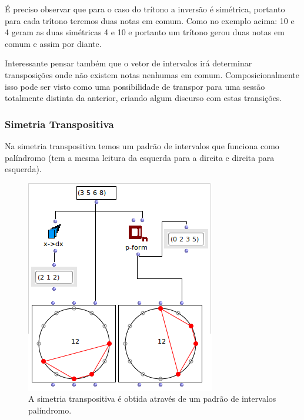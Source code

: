 \documentclass[
	12pt,				%
	openright,			%
	twoside,			%
	a4paper,			%
	english,			%
	french,				%
	spanish,			%
	brazil				%
	]{abntex2}
\begin{document}
É preciso observar que para o caso do trítono a inversão é simétrica, portanto para cada trítono teremos duas notas em comum. Como no exemplo acima: 10 e 4 geram as duas simétricas 4 e 10 e portanto um trítono gerou duas notas em comum e assim por diante.

Interessante pensar também que o vetor de intervalos irá determinar transposições onde não existem notas nenhumas em comum. Composicionalmente isso pode ser visto como uma possibilidade de transpor para uma sessão totalmente distinta da anterior, criando algum discurso com estas transições.


\subsubsection{Simetria Transpositiva}

Na simetria transpositiva temos um padrão de intervalos que funciona como palíndromo (tem a mesma leitura da esquerda para a direita e direita para esquerda).

\begin{figure}[!h]
	\caption{\label{fig_grafico}A simetria transpositiva é obtida através de um padrão de intervalos palíndromo. }
	\begin{center}
	    \includegraphics[scale=0.6]{OM_settheory/palindrome1.png}
	\end{center}
\end{figure}
\end{document}

